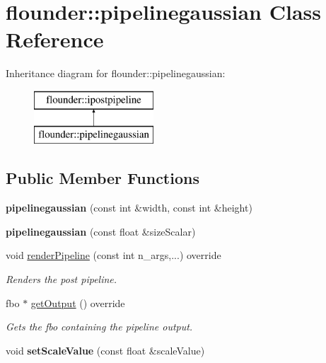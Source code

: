 \hypertarget{classflounder_1_1pipelinegaussian}{}\section{flounder\+:\+:pipelinegaussian Class Reference}
\label{classflounder_1_1pipelinegaussian}
Inheritance diagram for flounder\+:\+:pipelinegaussian\+:\begin{figure}[H]
\begin{center}
\leavevmode
\includegraphics[height=2.000000cm]{classflounder_1_1pipelinegaussian}
\end{center}
\end{figure}
\subsection*{Public Member Functions}
\begin{DoxyCompactItemize}
\item 
\mbox{\label{classflounder_1_1pipelinegaussian_a77e6dea87b6a7b14184c08449e9b965a}} 
{\bfseries pipelinegaussian} (const int \&width, const int \&height)
\item 
\mbox{\label{classflounder_1_1pipelinegaussian_a54aada433e11cfe54917179803ba9038}} 
{\bfseries pipelinegaussian} (const float \&size\+Scalar)
\item 
void \hyperlink{classflounder_1_1pipelinegaussian_a2d6372f1b428c3a09bf6fc2efaee3c83}{render\+Pipeline} (const int n\+\_\+args,...) override
\begin{DoxyCompactList}\small\item\em Renders the post pipeline. \end{DoxyCompactList}\item 
fbo $\ast$ \hyperlink{classflounder_1_1pipelinegaussian_aae27c8214a8a544b1ab96ddd2383a2b2}{get\+Output} () override
\begin{DoxyCompactList}\small\item\em Gets the fbo containing the pipeline output. \end{DoxyCompactList}\item 
\mbox{\label{classflounder_1_1pipelinegaussian_a3d05857ef2339b8ec0b974b3d6b08871}} 
void {\bfseries set\+Scale\+Value} (const float \&scale\+Value)
\end{DoxyCompactItemize}
